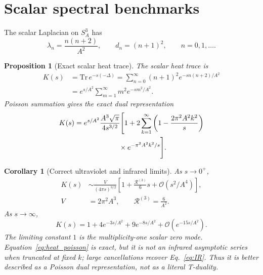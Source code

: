 \documentclass[
  aps,
  prd,
  reprint,
  superscriptaddress,
  nofootinbib,
  floatfix,
  longbibliography
]{revtex4-2}
\newtheorem{proposition}{Proposition}
\newtheorem{corollary}{Corollary}
\newcommand{\bigO}{\mathcal O}
\begin{document}
\section{Scalar spectral benchmarks}
\label{sec:spectral}

The scalar Laplacian on \(S_A^3\) has
\begin{equation}
  \lambda_n=\frac{n(n+2)}{A^2},\qquad d_n=(n+1)^2,\qquad n=0,1,\ldots .
  \label{eq:scalar_spec}
\end{equation}

\begin{proposition}[Exact scalar heat trace]
\label{prop:heat}
The scalar heat trace is
\begin{align}
  K(s)&=\mathrm{Tr}\,e^{-s(-\Delta)}
  =\sum_{n=0}^{\infty}(n+1)^2e^{-sn(n+2)/A^2}
  \nonumber\\
  &=e^{s/A^2}\sum_{m=1}^{\infty}m^2e^{-sm^2/A^2}.
  \label{eq:heat}
\end{align}
Poisson summation gives the exact dual representation
\begin{align}
  K(s)&=e^{s/A^2}\frac{A^3\sqrt{\pi}}{4s^{3/2}}
  \Bigg[
  1+2\sum_{k=1}^{\infty}
  \left(1-\frac{2\pi^2A^2k^2}{s}\right)
  \nonumber\\
  &\hspace{2.2cm}\times e^{-\pi^2A^2k^2/s}
  \Bigg].
  \label{eq:heat_poisson}
\end{align}
\end{proposition}

\begin{corollary}[Correct ultraviolet and infrared limits]
\label{cor:UVIR}
As \(s\to0^+\),
\begin{align}
  K(s)&\sim
  \frac{V}{(4\pi s)^{3/2}}
  \left[1+\frac{\mathcal R^{(3)}}{6}s+\bigO(s^2/A^4)\right],
  \nonumber\\
  V&=2\pi^2A^3,\qquad \mathcal R^{(3)}=\frac{6}{A^2}.
  \label{eq:weyl}
\end{align}
As \(s\to\infty\),
\begin{equation}
  K(s)=1+4e^{-3s/A^2}+9e^{-8s/A^2}+\bigO(e^{-15s/A^2}).
  \label{eq:IR}
\end{equation}
The limiting constant \(1\) is the multiplicity-one scalar zero mode.  Equation~\eqref{eq:heat_poisson} is exact, but it is not an infrared asymptotic
series when truncated at fixed \(k\); large cancellations recover
Eq.~\eqref{eq:IR}.  Thus it is better described as a Poisson dual
representation, not as a literal T-duality.
\end{corollary}
\end{document}
